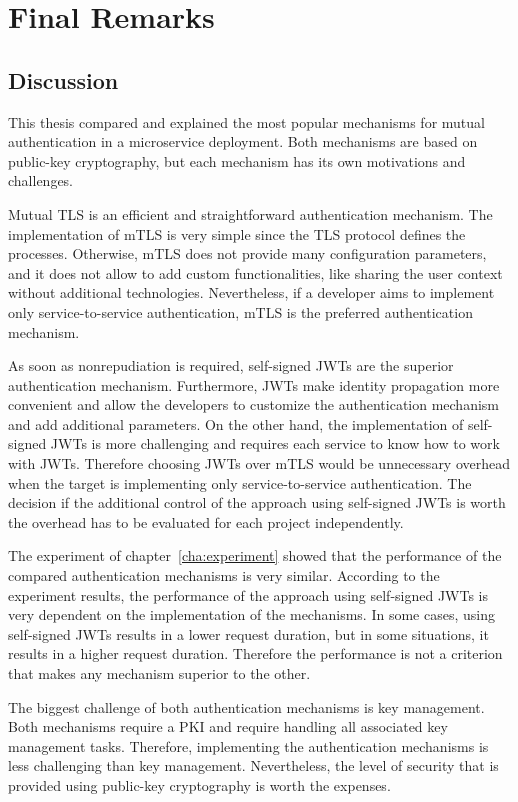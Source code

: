 \chapter{Final Remarks}
\label{cha:final_remarks}

\section{Discussion}
This thesis compared and explained the most popular mechanisms for mutual authentication in a microservice deployment.
Both mechanisms are based on public-key cryptography, but each mechanism has its own motivations and challenges.

Mutual TLS is an efficient and straightforward authentication mechanism.
The implementation of mTLS is very simple since the TLS protocol defines the processes.
Otherwise, mTLS does not provide many configuration parameters, and it does not allow to add custom functionalities, like sharing the user context without additional technologies.
Nevertheless, if a developer aims to implement only service-to-service authentication, mTLS is the preferred authentication mechanism.

As soon as nonrepudiation is required, self-signed JWTs are the superior authentication mechanism.
Furthermore, JWTs make identity propagation more convenient and allow the developers to customize the authentication mechanism and add additional parameters.
On the other hand, the implementation of self-signed JWTs is more challenging and requires each service to know how to work with JWTs.
Therefore choosing JWTs over mTLS would be unnecessary overhead when the target is implementing only service-to-service authentication.
The decision if the additional control of the approach using self-signed JWTs is worth the overhead has to be evaluated for each project independently.

The experiment of chapter~\ref{cha:experiment} showed that the performance of the compared authentication mechanisms is very similar.
According to the experiment results, the performance of the approach using self-signed JWTs is very dependent on the implementation of the mechanisms.
In some cases, using self-signed JWTs results in a lower request duration, but in some situations, it results in a higher request duration.
Therefore the performance is not a criterion that makes any mechanism superior to the other.

The biggest challenge of both authentication mechanisms is key management.
Both mechanisms require a PKI and require handling all associated key management tasks.
Therefore, implementing the authentication mechanisms is less challenging than key management.
Nevertheless, the level of security that is provided using public-key cryptography is worth the expenses.

